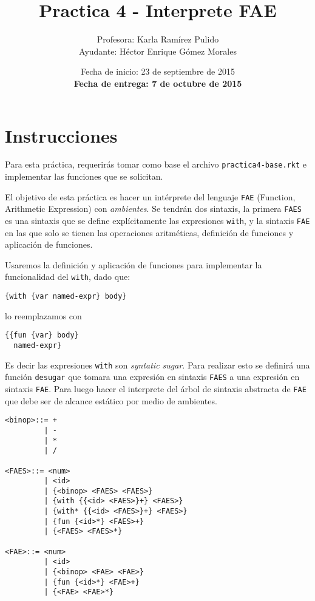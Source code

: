\documentclass{article}
\author{Profesora: Karla Ramírez Pulido\\
  Ayudante: Héctor Enrique Gómez Morales}
\title{Practica 4 - Interprete FAE}
\date{Fecha de inicio: 23 de septiembre de 2015\\
  \textbf{Fecha de entrega: 7 de octubre de 2015}}
\begin{document}
\maketitle
\section{Instrucciones}

Para esta práctica, requerirás tomar como base el archivo \texttt{practica4-base.rkt} e implementar las funciones que se solicitan.

El objetivo de esta práctica es hacer un intérprete del lenguaje \texttt{FAE} (Function, Arithmetic Expression) con \emph{ambientes}. Se tendrán dos sintaxis, la primera \texttt{FAES} es una sintaxis que se define explícitamente las expresiones \texttt{with}, y la sintaxis \texttt{FAE} en las que solo se tienen las operaciones aritméticas, definición de funciones y aplicación de funciones.

Usaremos la definición y aplicación de funciones para implementar la funcionalidad del \texttt{with}, dado que:
\begin{verbatim}
{with {var named-expr} body}

\end{verbatim}

lo reemplazamos con

\begin{verbatim}
{{fun {var} body}
  named-expr}
\end{verbatim}

Es decir las expresiones \texttt{with} son \emph{syntatic sugar}. Para realizar esto se definirá una función \texttt{desugar} que tomara una expresión en sintaxis \texttt{FAES} a una expresión en sintaxis \texttt{FAE}. Para luego hacer el interprete del árbol de sintaxis abstracta de \texttt{FAE} que debe ser de alcance estático por medio de ambientes.

\begin{verbatim}
<binop>::= +
         | -
         | *
         | /

<FAES>::= <num>
         | <id>
         | {<binop> <FAES> <FAES>}
         | {with {{<id> <FAES>}+} <FAES>}
         | {with* {{<id> <FAES>}+} <FAES>}
         | {fun {<id>*} <FAES>+}
         | {<FAES> <FAES>*}

<FAE>::= <num>
         | <id>
         | {<binop> <FAE> <FAE>}
         | {fun {<id>*} <FAE>+}
         | {<FAE> <FAE>*}
\end{verbatim}
\end{document}
